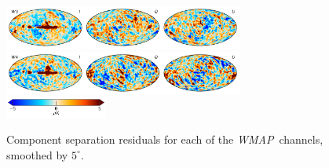 \documentclass[twocolumn]{../../common/aa}
\def\WMAP{\emph{WMAP}}
\newcommand{\BP}{\textsc{BeyondPlanck}}
\begin{document}
\begin{figure}
	\includegraphics[width=0.7\textwidth]{figures/compsep_res_W3_IQU.pdf}\\
	\includegraphics[width=0.7\textwidth]{figures/compsep_res_W4_IQU.pdf}\\
	\includegraphics[width=0.30\textwidth]{figures/cbar_5uK.pdf}
	\caption{Component separation residuals for each of the \WMAP\ channels, smoothed by $5^\circ$.}
	\label{fig:compsep_residual}
\end{figure}



\end{document}
